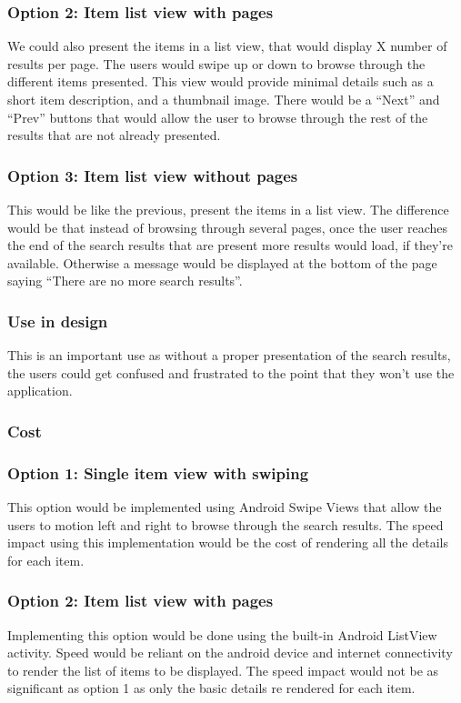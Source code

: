 \documentclass[journal,compsoc, 10pt, draftclsnofoot, onecolumn]{IEEEtran}
\begin{document}
\subsubsection*{Option 2: Item list view with pages}

We could also present the items in a list view, that would display X number of 
results per page. The users would swipe up or down to browse through the different 
items presented. This view would provide minimal details such as a short item 
description, and a thumbnail image. There would be a ``Next'' and ``Prev'' buttons 
that would allow the user to browse through the rest of the results that are not 
already presented.

\subsubsection*{Option 3: Item list view without pages}
This would be like the previous, present the items in a list view. The difference 
would be that instead of browsing through several pages, once the user reaches the 
end of the search results that are present more results would load, if they're 
available. Otherwise a message would be displayed at the bottom of the page saying 
``There are no more search results''.

\subsubsection{Use in design}
This is an important use as without a proper presentation of the search results, 
the users could get confused and frustrated to the point that they won't use the 
application.
\subsubsection{Cost}
\subsubsection*{Option 1: Single item view with swiping}
This option would be implemented using Android Swipe Views that allow the users 
to motion left and right to browse through the search results. The speed impact 
using this implementation would be the cost of rendering all the details for each 
item. 
\subsubsection*{Option 2: Item list view with pages}
Implementing this option would be done using the built-in Android ListView 
activity. Speed would be reliant on the android device and internet connectivity 
to render the list of items to be displayed. The speed impact would not be as 
significant as option 1 as only the basic details re rendered for each item.
\end{document}
